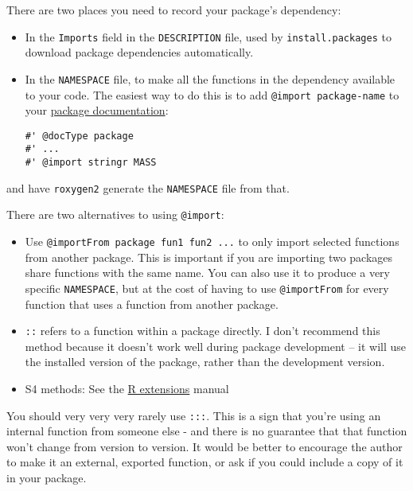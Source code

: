 There are two places you need to record your package's dependency:

\begin{itemize}
\item
  In the \texttt{Imports} field in the \texttt{DESCRIPTION} file, used
  by \texttt{install.packages} to download package dependencies
  automatically.
\item
  In the \texttt{NAMESPACE} file, to make all the functions in the
  dependency available to your code. The easiest way to do this is to
  add \texttt{@import   package-name} to your
  \href{Documenting-packages.html}{package documentation}:

\begin{verbatim}
#' @docType package
#' ...
#' @import stringr MASS
\end{verbatim}
\end{itemize}

and have \texttt{roxygen2} generate the \texttt{NAMESPACE} file from
that.

There are two alternatives to using \texttt{@import}:

\begin{itemize}
\item
  Use \texttt{@importFrom package fun1 fun2 ...} to only import selected
  functions from another package. This is important if you are importing
  two packages share functions with the same name. You can also use it
  to produce a very specific \texttt{NAMESPACE}, but at the cost of
  having to use \texttt{@importFrom} for every function that uses a
  function from another package.
\item
  \texttt{::} refers to a function within a package directly. I don't
  recommend this method because it doesn't work well during package
  development -- it will use the installed version of the package,
  rather than the development version.
\item
  S4 methods: See the
  \href{http://cran.r-project.org/doc/manuals/R-exts.html\#Name-spaces-with-S4-classes-and-methods}{R
  extensions} manual
\end{itemize}

You should very very very rarely use \texttt{:::}. This is a sign that
you're using an internal function from someone else - and there is no
guarantee that that function won't change from version to version. It
would be better to encourage the author to make it an external, exported
function, or ask if you could include a copy of it in your package.

